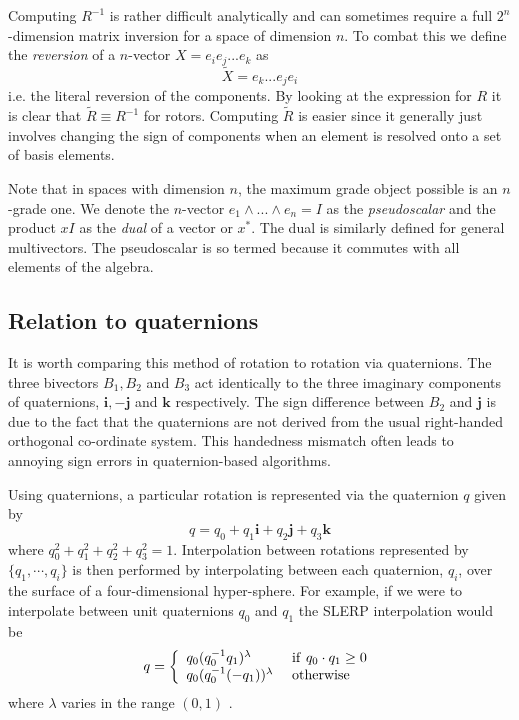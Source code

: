 Computing $R^{-1}$ is rather difficult analytically and can sometimes
require a full $2^n$-dimension matrix inversion for a space of
dimension $n$. To combat this we define
the \emph{reversion} of a $n$-vector $X = e_ie_j...e_k$ as
\[
\tilde{X} = e_k...e_je_i
\]
i.e. the literal reversion of the components. By looking at the expression for
$R$ it is clear that $\tilde{R} \equiv R^{-1}$ for rotors. Computing
$\tilde{R}$ is easier since it generally just involves changing the sign of
components when an element is resolved onto a set of basis elements.

Note that in spaces with dimension $n$, the maximum grade object possible is
an $n$-grade one. We denote the $n$-vector $e_1 \wedge ... \wedge e_n = I$ as
the \emph{pseudoscalar} and the product $xI$ as the \emph{dual} of a vector or
$x^*$. The dual is similarly defined for general multivectors. The
pseudoscalar is so termed because it commutes with all elements of the
algebra.

\subsection{Relation to quaternions}
\label{sec:quaternions}

It is worth comparing this method of rotation to rotation via
quaternions. The three bivectors $B_1,B_2$ and $B_3$ act identically to the
three imaginary components of quaternions, $\mathbf{i}, -\mathbf{j}$ and
$\mathbf{k}$ respectively. The sign difference between $B_2$ and $\mathbf{j}$
is due to the fact that the quaternions are not derived from the usual
right-handed orthogonal co-ordinate system. This handedness mismatch often
leads to annoying sign errors in quaternion-based algorithms.

Using quaternions, a particular rotation is represented via the quaternion 
$q$ given by
\[
q = q_0 + q_1 \mathbf{i} + q_2 \mathbf{j} + q_3 \mathbf{k}
\]
where $q_0^2 + q_1^2 + q_2^2 + q_3^2 = 1$. Interpolation between rotations 
represented
by $\{ q_1, \cdots, q_i \}$ is then performed by interpolating between
each quaternion, $q_i$,
over the surface of a four-dimensional hyper-sphere. For example, if we 
were to interpolate
between unit quaternions $q_0$ and $q_1$ the SLERP interpolation would be
\[
q = \left\{
\begin{array}{ll}
q_0(q_0^{-1}q_1)^\lambda & {\rm ~if~} q_0 \cdot q_1 \ge 0 \\
q_0(q_0^{-1}(-q_1))^\lambda & {\rm ~otherwise}
\end{array}
\right.
\]
where $\lambda$ varies in the range $(0,1)$ \cite{slerp}.

